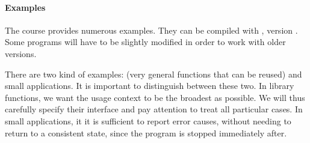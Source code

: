 \paragraph{Examples}

The course provides numerous examples. They can be compiled with
{\ocaml}, version {\ocamlversion}$\!\!\!$.  %
Some programs will have to be slightly modified in order to work with 
older versions.

There are two kind of examples:  (very
general functions that can be reused) and small applications. It is
important to distinguish between these two. In library functions, we
want the usage context to be the broadest as possible. We will thus
carefully specify their interface and pay attention to treat all
particular cases. In small applications, it it is sufficient to report
error causes, without needing to return to a consistent state, since
the program is stopped immediately after.
